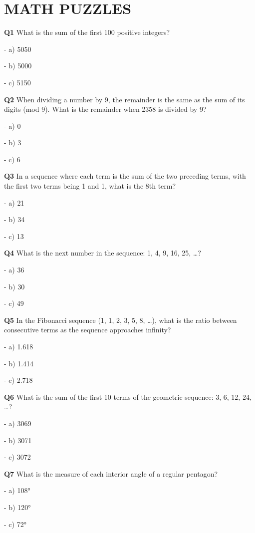 \section{MATH PUZZLES}

\textbf{Q1} What is the sum of the first 100 positive integers?\par
\quad - a) 5050\par
\quad - b) 5000\par
\quad - c) 5150\par

\textbf{Q2} When dividing a number by 9, the remainder is the same as the sum of its digits (mod 9). What is the remainder when 2358 is divided by 9?\par
\quad - a) 0\par
\quad - b) 3\par
\quad - c) 6\par

\textbf{Q3} In a sequence where each term is the sum of the two preceding terms, with the first two terms being 1 and 1, what is the 8th term?\par
\quad - a) 21\par
\quad - b) 34\par
\quad - c) 13\par

\textbf{Q4} What is the next number in the sequence: 1, 4, 9, 16, 25, …?\par
\quad - a) 36\par
\quad - b) 30\par
\quad - c) 49\par

\textbf{Q5} In the Fibonacci sequence (1, 1, 2, 3, 5, 8, …), what is the ratio between consecutive terms as the sequence approaches infinity?\par
\quad - a) 1.618\par
\quad - b) 1.414\par
\quad - c) 2.718\par

\textbf{Q6} What is the sum of the first 10 terms of the geometric sequence: 3, 6, 12, 24, …?\par
\quad - a) 3069\par
\quad - b) 3071\par
\quad - c) 3072\par

\textbf{Q7} What is the measure of each interior angle of a regular pentagon?\par
\quad - a) 108°\par
\quad - b) 120°\par
\quad - c) 72°\par

